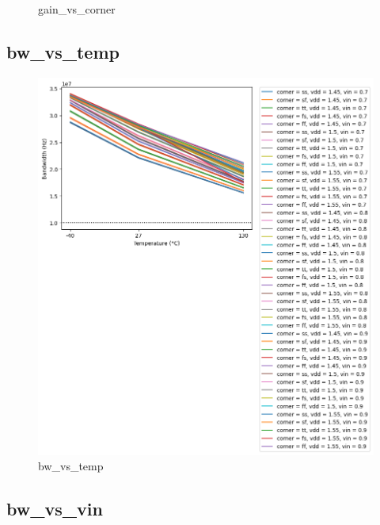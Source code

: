 \documentclass[
  a4paper,
  DIV=11,
  numbers=noendperiod]{scrartcl}
\begin{document}
\begin{tcolorbox}
\begin{figure}[H]
{}

\caption{gain\_vs\_corner}

\end{figure}%

\subsection*{bw\_vs\_temp}\label{bw_vs_temp}

\begin{figure}[H]

{\centering \includegraphics{./cace/_docs/ota-5t/schematic/bw_vs_temp.png}

}

\caption{bw\_vs\_temp}

\end{figure}%

\subsection*{bw\_vs\_vin}\label{bw_vs_vin}

\begin{figure}[H]


\end{figure}
\end{tcolorbox}
\end{document}
